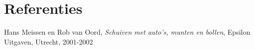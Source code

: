 \section{Referenties}

\begin{thebibliography}{1}
\label{1} Hans Meissen en Rob van Oord, \textit{Schuiven met auto's, munten en bollen}, Epsilon Uitgaven, Utrecht, 2001-2002\\
\end{thebibliography}
